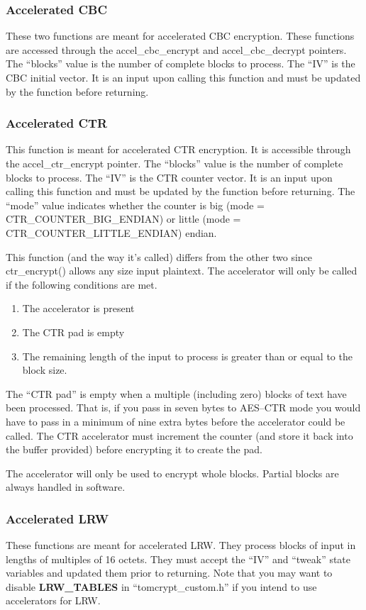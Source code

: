 \documentclass[a4paper]{book}
\begin{document}
\subsubsection{Accelerated CBC} 
These two functions are meant for accelerated CBC encryption.  These functions are accessed through the accel\_cbc\_encrypt and accel\_cbc\_decrypt pointers.
The ``blocks'' value is the number of complete blocks to process.  The ``IV'' is the CBC initial vector.  It is an input upon calling this function and must be
updated by the function before returning.  

\subsubsection{Accelerated CTR}
This function is meant for accelerated CTR encryption.  It is accessible through the accel\_ctr\_encrypt pointer.
The ``blocks'' value is the number of complete blocks to process.  The ``IV'' is the CTR counter vector.  It is an input upon calling this function and must be
updated by the function before returning.  The ``mode'' value indicates whether the counter is big (mode = CTR\_COUNTER\_BIG\_ENDIAN) or 
little (mode = CTR\_COUNTER\_LITTLE\_ENDIAN) endian.

This function (and the way it's called) differs from the other two since ctr\_encrypt() allows any size input plaintext.  The accelerator will only be
called if the following conditions are met.

\begin{enumerate}
   \item The accelerator is present
   \item The CTR pad is empty
   \item The remaining length of the input to process is greater than or equal to the block size.
\end{enumerate}

The ``CTR pad'' is empty when a multiple (including zero) blocks of text have been processed.  That is, if you pass in seven bytes to AES--CTR mode you would have to 
pass in a minimum of nine extra bytes before the accelerator could be called.  The CTR accelerator must increment the counter (and store it back into the 
buffer provided) before encrypting it to create the pad.  

The accelerator will only be used to encrypt whole blocks.  Partial blocks are always handled in software.

\subsubsection{Accelerated LRW}
These functions are meant for accelerated LRW.  They process blocks of input in lengths of multiples of 16 octets.  They must accept the ``IV'' and ``tweak''
state variables and updated them prior to returning.  Note that you may want to disable \textbf{LRW\_TABLES} in ``tomcrypt\_custom.h'' if you intend
to use accelerators for LRW.
\end{document}
